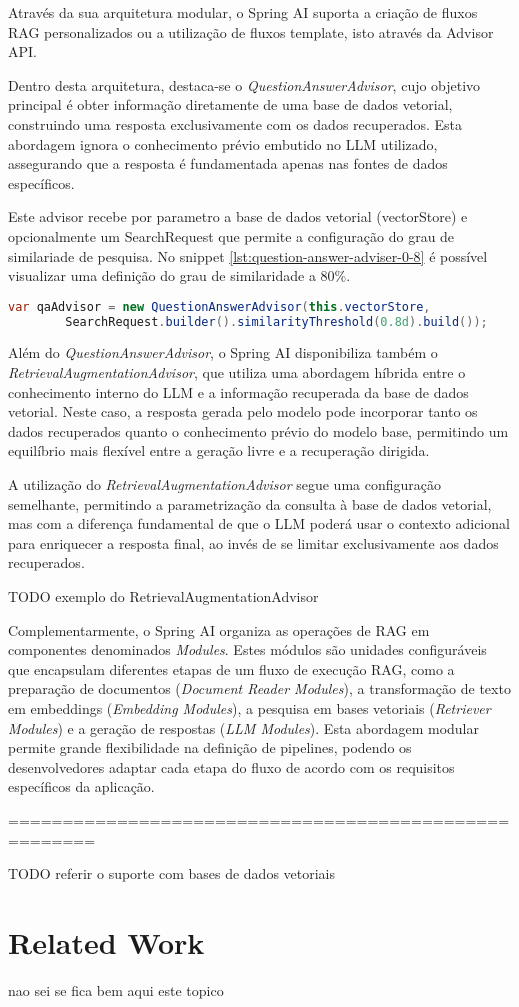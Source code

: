 Através da sua arquitetura modular, o Spring AI suporta a criação de fluxos RAG personalizados ou a utilização de fluxos template, isto através da Advisor API. 

Dentro desta arquitetura, destaca-se o \emph{QuestionAnswerAdvisor}, cujo objetivo principal é obter informação diretamente de uma base de dados vetorial, construindo uma resposta exclusivamente com os dados recuperados. Esta abordagem ignora o conhecimento prévio embutido no LLM utilizado, assegurando que a resposta é fundamentada apenas nas fontes de dados específicos.

Este advisor recebe por parametro a base de dados vetorial (vectorStore) e opcionalmente um SearchRequest que permite a configuração do grau de similariade de pesquisa. No snippet \ref{lst:question-answer-adviser-0-8} é possível visualizar uma definição do grau de similaridade a 80\%.


\begin{lstlisting}[language=Java, caption={Configuração do grau de similaridade do QuestionAnswerAdvisor}, label={lst:question-answer-adviser-0-8}]
var qaAdvisor = new QuestionAnswerAdvisor(this.vectorStore,
        SearchRequest.builder().similarityThreshold(0.8d).build());
\end{lstlisting}


Além do \emph{QuestionAnswerAdvisor}, o Spring AI disponibiliza também o \emph{RetrievalAugmentationAdvisor}, que utiliza uma abordagem híbrida entre o conhecimento interno do LLM e a informação recuperada da base de dados vetorial. Neste caso, a resposta gerada pelo modelo pode incorporar tanto os dados recuperados quanto o conhecimento prévio do modelo base, permitindo um equilíbrio mais flexível entre a geração livre e a recuperação dirigida.

A utilização do \emph{RetrievalAugmentationAdvisor} segue uma configuração semelhante, permitindo a parametrização da consulta à base de dados vetorial, mas com a diferença fundamental de que o LLM poderá usar o contexto adicional para enriquecer a resposta final, ao invés de se limitar exclusivamente aos dados recuperados.

TODO exemplo do RetrievalAugmentationAdvisor

Complementarmente, o Spring AI organiza as operações de RAG em componentes denominados \emph{Modules}. Estes módulos são unidades configuráveis que encapsulam diferentes etapas de um fluxo de execução RAG, como a preparação de documentos (\emph{Document Reader Modules}), a transformação de texto em embeddings (\emph{Embedding Modules}), a pesquisa em bases vetoriais (\emph{Retriever Modules}) e a geração de respostas (\emph{LLM Modules}). Esta abordagem modular permite grande flexibilidade na definição de pipelines, podendo os desenvolvedores adaptar cada etapa do fluxo de acordo com os requisitos específicos da aplicação.


======================================================



TODO referir o suporte com bases de dados vetoriais







\section{Related Work}

nao sei se fica bem aqui este topico



